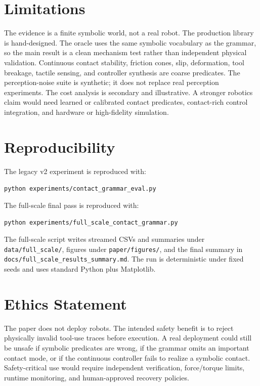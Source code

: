 \documentclass{article}
\begin{document}
\section{Limitations}

The evidence is a finite symbolic world, not a real robot. The production library is hand-designed. The oracle uses the same symbolic vocabulary as the grammar, so the main result is a clean mechanism test rather than independent physical validation. Continuous contact stability, friction cones, slip, deformation, tool breakage, tactile sensing, and controller synthesis are coarse predicates. The perception-noise suite is synthetic; it does not replace real perception experiments. The cost analysis is secondary and illustrative. A stronger robotics claim would need learned or calibrated contact predicates, contact-rich control integration, and hardware or high-fidelity simulation.

\section{Reproducibility}

The legacy v2 experiment is reproduced with:
\begin{center}
\texttt{python experiments/contact\_grammar\_eval.py}
\end{center}
The full-scale final pass is reproduced with:
\begin{center}
\texttt{python experiments/full\_scale\_contact\_grammar.py}
\end{center}
The full-scale script writes streamed CSVs and summaries under \texttt{data/full\_scale/}, figures under \texttt{paper/figures/}, and the final summary in \texttt{docs/full\_scale\_results\_summary.md}. The run is deterministic under fixed seeds and uses standard Python plus Matplotlib.

\section{Ethics Statement}

The paper does not deploy robots. The intended safety benefit is to reject physically invalid tool-use traces before execution. A real deployment could still be unsafe if symbolic predicates are wrong, if the grammar omits an important contact mode, or if the continuous controller fails to realize a symbolic contact. Safety-critical use would require independent verification, force/torque limits, runtime monitoring, and human-approved recovery policies.
\end{document}
